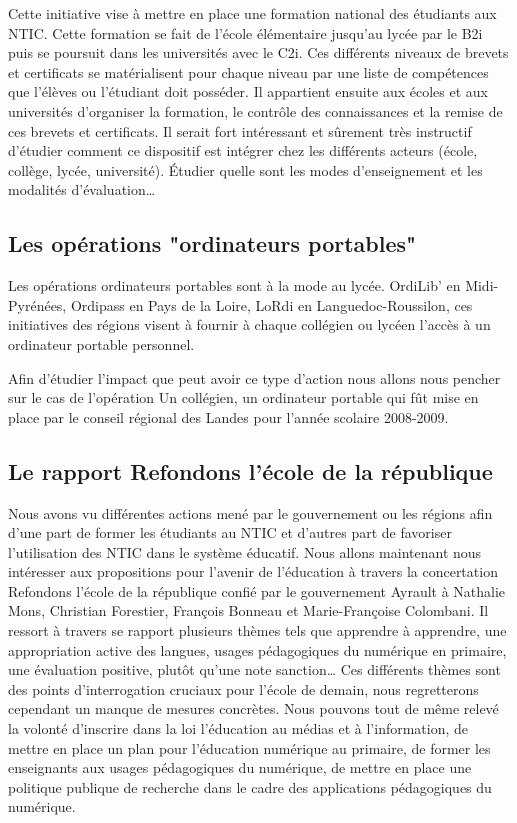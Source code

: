 Cette initiative vise à mettre en place une formation national des
étudiants aux NTIC\cite{b2i_c2i}. Cette formation se fait de l'école élémentaire
jusqu'au lycée par le B2i puis se poursuit dans les universités avec
le C2i. Ces différents niveaux de brevets et certificats se
matérialisent pour chaque niveau par une liste de compétences que
l'élèves ou l'étudiant doit posséder. Il appartient ensuite aux écoles
et aux universités d'organiser la formation, le contrôle des
connaissances et la remise de ces brevets et certificats. Il serait
fort intéressant et sûrement très instructif d'étudier comment ce
dispositif est intégrer chez les différents acteurs (école, collège,
lycée, université). Étudier quelle sont les modes d'enseignement et
les modalités d'évaluation\ldots

\subsection{Les opérations "ordinateurs portables"}

Les opérations \og{}ordinateurs portables\fg{} sont à la mode au
lycée. OrdiLib' en Midi-Pyrénées, Ordipass en Pays de la Loire, LoRdi
en Languedoc-Roussilon, ces initiatives des régions visent à fournir à
chaque collégien ou lycéen l'accès à un ordinateur portable personnel.

Afin d'étudier l'impact que peut avoir ce type d'action nous allons
nous pencher sur le cas de l'opération \og{}Un collégien, un
ordinateur portable\fg{} qui fût mise en place par le conseil régional
des Landes pour l'année scolaire 2008-2009. %
\cite{portables35}
\cite{portables60}
\cite{portables40}


\subsection{Le rapport \og{}Refondons l'école de la république\fg{}}

Nous avons vu différentes actions mené par le gouvernement ou les régions afin d'une part de former les étudiants au NTIC et d'autres part de favoriser l'utilisation des NTIC dans le système éducatif. Nous allons maintenant nous intéresser aux propositions pour l'avenir de l'éducation à travers la concertation \og{}Refondons l'école de la république\fg{} confié par le gouvernement Ayrault à Nathalie Mons, Christian Forestier, François Bonneau et Marie-Françoise Colombani. Il ressort à travers se rapport plusieurs thèmes tels que \og{}apprendre à apprendre\fg{}, \og{}une appropriation active des langues\fg{}, \og{}usages pédagogiques du numérique en primaire\fg{}, \og{}une évaluation positive, plutôt qu'une note sanction\fg{}… Ces différents thèmes sont des points d'interrogation cruciaux pour l'école de demain, nous regretterons cependant un manque de mesures concrètes. Nous pouvons tout de même relevé la volonté d'inscrire dans la loi \og l'éducation au médias et à l'information\fg{}, de mettre en place un plan pour l'éducation numérique au primaire, de former les enseignants aux usages pédagogiques du numérique, de mettre en place une politique publique de recherche dans le cadre des applications pédagogiques du numérique.

